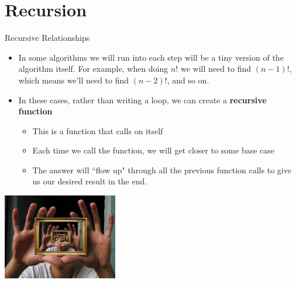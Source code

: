 {}\documentclass[letterpaper,
compress,
xcolor=x11names,
]{beamer}
\begin{document}
\section{Recursion}

\begin{frame}{Recursive Relationships}
	\footnotesize
	\begin{itemize}
		\item In some algorithms we will run into each step will be a tiny version of the algorithm itself. For example, when doing $n!$ we will need to find $(n-1)!$, which means we'll need to find $(n-2)!$, and so on. 
		\item In these cases, rather than writing a loop, we can create a \textbf{recursive function}
		\begin{itemize}
			\item This is a function that calls on itself
			\item Each time we call the function, we will get closer to some base case
			\item The answer will ``flow up" through all the previous function calls to give us our desired result in the end.
		\end{itemize} 
	\end{itemize}
	\begin{center}
		\includegraphics[width = 5cm]{recursion_mirror.jpg}
	\end{center}
\end{frame}

\end{document}
